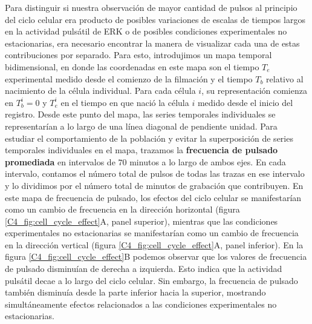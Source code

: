 \documentclass[./main.tex]{subfiles}
\begin{document}
Para distinguir si nuestra observación de mayor cantidad de pulsos al principio del ciclo celular era producto de posibles variaciones de escalas de tiempos largos en la actividad pulsátil de ERK o de posibles condiciones experimentales no estacionarias, era necesario encontrar la manera de visualizar cada una de estas contribuciones por separado. Para esto, introdujimos un mapa temporal bidimensional, en donde las coordenadas en este mapa son el tiempo $T_e$ experimental medido desde el comienzo de la filmación y el tiempo $T_b$ relativo al nacimiento de la célula individual. Para cada célula $i$, su representación comienza en $T_b^i= 0$ y $T_e^i$ en el tiempo en que nació la célula $i$ medido desde el inicio del registro. Desde este punto del mapa, las series temporales individuales se representarían a lo largo de una línea diagonal de pendiente unidad. Para estudiar el comportamiento de la población y evitar la superposición de series temporales individuales en el mapa, trazamos la \textbf{frecuencia de pulsado promediada} en intervalos de $70$ minutos a lo largo de ambos ejes. En cada intervalo, contamos el número total de pulsos de todas las trazas en ese intervalo y lo dividimos por el número total de minutos de grabación que contribuyen. En este mapa de frecuencia de pulsado, los efectos del ciclo celular se manifestarían como un cambio de frecuencia en la dirección horizontal (figura \ref{C4_fig:cell_cycle_effect}A, panel superior), mientras que las condiciones experimentales no estacionarias se manifestarían como un cambio de frecuencia en la dirección vertical (figura \ref{C4_fig:cell_cycle_effect}A, panel inferior). En la figura \ref{C4_fig:cell_cycle_effect}B podemos observar que los valores de frecuencia de pulsado disminuían de derecha a izquierda. Esto indica que la actividad pulsátil decae a lo largo del ciclo celular. Sin embargo, la frecuencia de pulsado también disminuía desde la parte inferior hacia la superior, mostrando simultáneamente efectos relacionados a las condiciones experimentales no estacionarias. 
\end{document}
